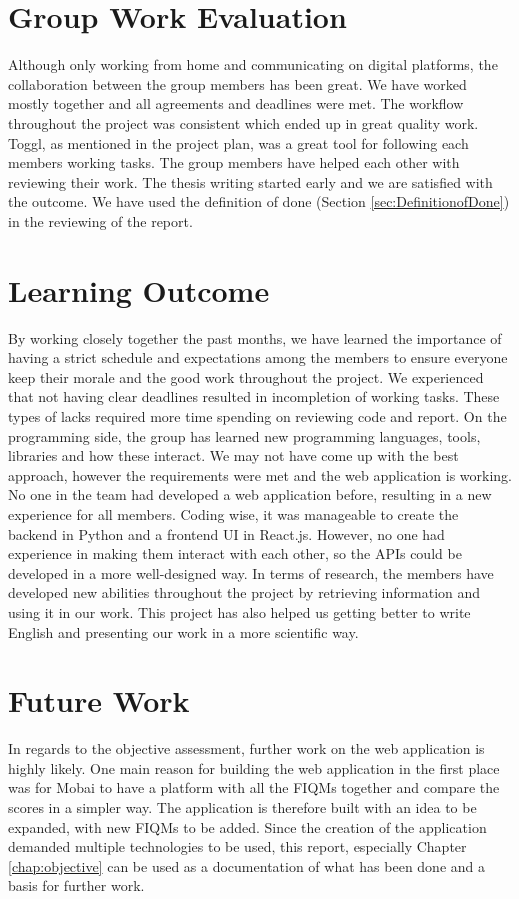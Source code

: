 \section{Group Work Evaluation}
\label{sec:groupworkevaluation}
Although only working from home and communicating on digital platforms, the collaboration between the group members has been great. We have worked mostly together and all agreements and deadlines were met. The workflow throughout the project was consistent which ended up in great quality work. Toggl, as mentioned in the project plan, was a great tool for following each members working tasks. The group members have helped each other with reviewing their work. The thesis writing started early and we are satisfied with the outcome. We have used the definition of done (Section \ref{sec:DefinitionofDone}) in the reviewing of the report. 

\section{Learning Outcome}
\label{sec:learningoutcome}
By working closely together the past months, we have learned the importance of having a strict schedule and expectations among the members to ensure everyone keep their morale and the good work throughout the project. We experienced that not having clear deadlines resulted in incompletion of working tasks. These types of lacks required more time spending on reviewing code and report. On the programming side, the group has learned new programming languages, tools, libraries and how these interact. We may not have come up with the best approach, however the requirements were met and the web application is working. No one in the team had developed a web application before, resulting in a new experience for all members. Coding wise, it was manageable to create the backend in Python and a frontend UI in React.js. However, no one had experience in making them interact with each other, so the APIs could be developed in a more well-designed way. In terms of research, the members have developed new abilities throughout the project by retrieving information and using it in our work. This project has also helped us getting better to write English and presenting our work in a more scientific way. 

\section{Future Work}
\label{sec:futurework}
In regards to the objective assessment, further work on the web application is highly likely. One main reason for building the web application in the first place was for Mobai to have a platform with all the FIQMs together and compare the scores in a simpler way. The application is therefore built with an idea to be expanded, with new FIQMs to be added. Since the creation of the application demanded multiple technologies to be used, this report, especially Chapter \ref{chap:objective} can be used as a documentation of what has been done and a basis for further work. 

